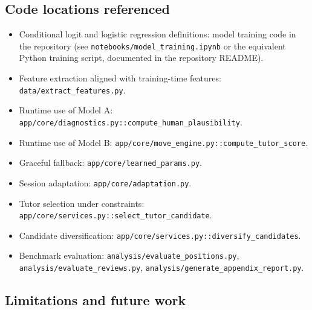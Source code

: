 \documentclass[11pt]{article}
\begin{document}
\subsection{Code locations referenced}
\begin{itemize}[leftmargin=*,topsep=0pt,itemsep=1pt]
\item Conditional logit and logistic regression definitions: model training code in the repository (see \texttt{notebooks/model\_training.ipynb} or the equivalent Python training script, documented in the repository README).
\item Feature extraction aligned with training-time features: \texttt{data/extract\_features.py}.
\item Runtime use of Model A: \texttt{app/core/diagnostics.py::compute\_human\_plausibility}.
\item Runtime use of Model B: \texttt{app/core/move\_engine.py::compute\_tutor\_score}.
\item Graceful fallback: \texttt{app/core/learned\_params.py}.
\item Session adaptation: \texttt{app/core/adaptation.py}.
\item Tutor selection under constraints: \texttt{app/core/services.py::select\_tutor\_candidate}.
\item Candidate diversification: \texttt{app/core/services.py::diversify\_candidates}.
\item Benchmark evaluation: \texttt{analysis/evaluate\_positions.py}, \texttt{analysis/evaluate\_reviews.py}, \texttt{analysis/generate\_appendix\_report.py}.
\end{itemize}

\subsection{Limitations and future work}
\end{document}
